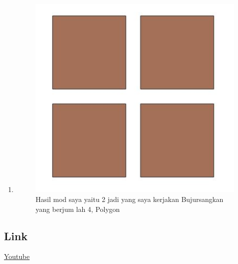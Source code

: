 \begin{enumerate}
	\item 
	
	\begin{figure}[H]
		\includegraphics[width=12cm]{figures/1174042/No10.JPG}
		\centering
		\caption{Hasil mod saya yaitu 2 jadi yang saya kerjakan Bujursangkan yang berjum lah 4, Polygon}
	\end{figure}	
\end{enumerate}

\subsection{Link}
\href{https://youtu.be/4O3oxQESyjM}{Youtube}